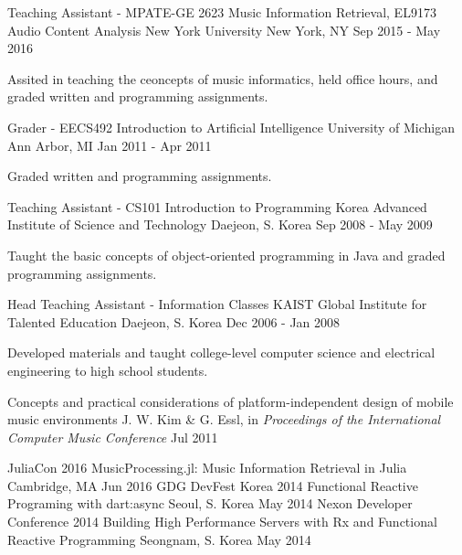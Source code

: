 \documentclass[12pt, a4paper]{awesome-cv}
\begin{document}
	\begin{cventries}
		\cventry
		{Teaching Assistant - MPATE-GE 2623 Music Information Retrieval, EL9173 Audio Content Analysis}
		{New York University}
		{New York, NY}
		{Sep 2015 - May 2016}
		{
			\begin{cvitems}
				\item {Assited in teaching the ceoncepts of music informatics, held office hours, and graded written and programming assignments.}
			\end{cvitems}
		}
		\cventry
		{Grader - EECS492 Introduction to Artificial Intelligence}
		{University of Michigan}
		{Ann Arbor, MI}
		{Jan 2011 - Apr 2011}
		{
			\begin{cvitems}
				\item {Graded written and programming assignments.}
			\end{cvitems}
		}
		\cventry
		{Teaching Assistant - CS101 Introduction to Programming}
		{Korea Advanced Institute of Science and Technology}
		{Daejeon, S. Korea}
		{Sep 2008 - May 2009}
		{
			\begin{cvitems}
				\item {Taught the basic concepts of object-oriented programming in Java and graded programming assignments.}
			\end{cvitems}
		}
		\cventry
		{Head Teaching Assistant - Information Classes}
		{KAIST Global Institute for Talented Education}
		{Daejeon, S. Korea}
		{Dec 2006 - Jan 2008}
		{
			\begin{cvitems}
				\item {Developed materials and taught college-level computer science and electrical engineering to high school students.}
			\end{cvitems}
		}
	\end{cventries}

	\cvsection{Publication}
	\begin{cventries}
		\cvpublication
		{Concepts and practical considerations of platform-independent design of mobile music environments}
		{J. W. Kim \& G. Essl, in \textit{Proceedings of the International Computer Music Conference}}
		{Jul 2011}
	\end{cventries}
	
	\cvsection{Presentations}
	\begin{cventries}
		\cvsimpleentry
		{JuliaCon 2016}
		{MusicProcessing.jl: Music Information Retrieval in Julia}
		{Cambridge, MA}
		{Jun 2016}
		\cvsimpleentry
		{GDG DevFest Korea 2014}
		{Functional Reactive Programing with dart:async}
		{Seoul, S. Korea}
		{May 2014}
		\cvsimpleentry
		{Nexon Developer Conference 2014}
		{Building High Performance Servers with Rx and Functional Reactive Programming}
		{Seongnam, S. Korea}
		{May 2014}
	\end{cventries}
	
\end{document}
